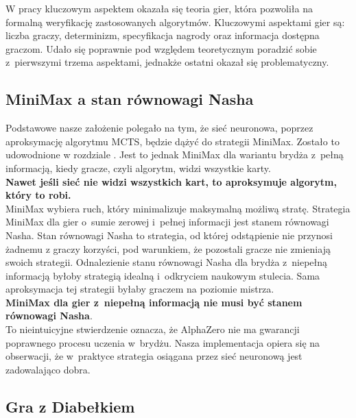 W pracy kluczowym aspektem okazała się teoria gier, która pozwoliła na
formalną weryfikację zastosowanych algorytmów.
Kluczowymi aspektami gier są: liczba graczy, determinizm,
specyfikacja nagrody oraz informacja dostępna graczom.
Udało się poprawnie pod względem teoretycznym poradzić sobie
z~pierwszymi trzema aspektami, jednakże ostatni okazał się
problematyczny.

\subsection*{MiniMax a stan równowagi Nasha}

Podstawowe nasze założenie polegało na tym, że
sieć neuronowa, poprzez aproksymację algorytmu MCTS,
będzie dążyć do strategii MiniMax.
Zostało to udowodnione w rozdziale .
Jest to jednak MiniMax dla wariantu brydża z~pełną informacją,
kiedy gracze, czyli algorytm, widzi wszystkie karty.
\\
\textbf{Nawet jeśli sieć nie widzi wszystkich kart,
to aproksymuje algorytm, który to robi.}
\\
MiniMax wybiera ruch, który minimalizuje maksymalną możliwą stratę.
Strategia MiniMax dla gier o~sumie zerowej i~pełnej informacji
jest stanem równowagi Nasha.
Stan równowagi Nasha to strategia, od której odstąpienie
nie przynosi żadnemu z graczy korzyści, pod warunkiem,
że pozostali gracze nie zmieniają swoich strategii.
Odnalezienie stanu równowagi Nasha dla brydża z~niepełną informacją
byłoby strategią idealną i~odkryciem naukowym stulecia.
Sama aproksymacja tej strategii byłaby graczem na poziomie mistrza.
\\
\textbf{MiniMax dla gier z~niepełną informacją nie musi być stanem równowagi Nasha}.
\\
To nieintuicyjne stwierdzenie oznacza, że AlphaZero nie ma gwarancji
poprawnego procesu uczenia w~brydżu.
Nasza implementacja opiera się na obserwacji, że w~praktyce
strategia osiągana przez sieć neuronową jest zadowalająco dobra.

\subsection*{Gra z Diabełkiem}

